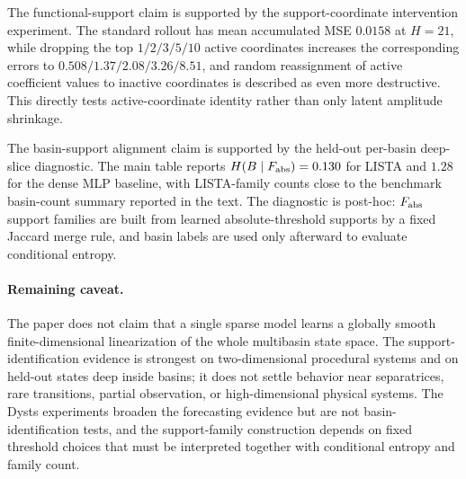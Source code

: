 The functional-support claim is supported by the support-coordinate intervention experiment. The standard rollout has mean accumulated MSE \(0.0158\) at \(H=21\), while dropping the top \(1/2/3/5/10\) active coordinates increases the corresponding errors to \(0.508/1.37/2.08/3.26/8.51\), and random reassignment of active coefficient values to inactive coordinates is described as even more destructive. This directly tests active-coordinate identity rather than only latent amplitude shrinkage.

The basin-support alignment claim is supported by the held-out per-basin deep-slice diagnostic. The main table reports \(H(B\mid F_{\rm abs})=0.130\) for LISTA and \(1.28\) for the dense MLP baseline, with LISTA-family counts close to the benchmark basin-count summary reported in the text. The diagnostic is post-hoc: \(F_{\rm abs}\) support families are built from learned absolute-threshold supports by a fixed Jaccard merge rule, and basin labels are used only afterward to evaluate conditional entropy.

\paragraph{Remaining caveat.}
The paper does not claim that a single sparse model learns a globally smooth finite-dimensional linearization of the whole multibasin state space. The support-identification evidence is strongest on two-dimensional procedural systems and on held-out states deep inside basins; it does not settle behavior near separatrices, rare transitions, partial observation, or high-dimensional physical systems. The Dysts experiments broaden the forecasting evidence but are not basin-identification tests, and the support-family construction depends on fixed threshold choices that must be interpreted together with conditional entropy and family count.
